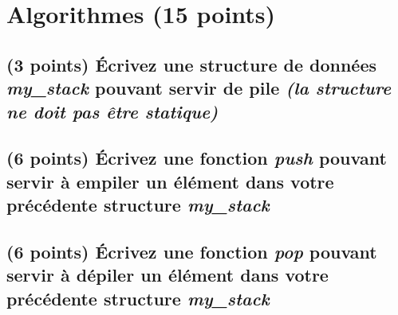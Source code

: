 \documentclass[11pt,a4paper]{article}
\begin{document}
%
\section{Algorithmes (15 points)}

\subsection{(3 points) \'Ecrivez une structure de données \og \textit{my\_stack} \fg{} pouvant servir de pile \textit{(la structure ne doit pas être statique)} }

\bigskip

\begin{center}
\end{center}

\bigskip


\newpage

\subsection{(6 points) \'Ecrivez une fonction \og \textit{push} \fg{} pouvant servir à empiler un élément dans votre précédente structure \og \textit{my\_stack} \fg{} }

\bigskip

\begin{center}

\end{center}

\bigskip


\newpage

\subsection{(6 points) \'Ecrivez une fonction \og \textit{pop} \fg{} pouvant servir à dépiler un élément dans votre précédente structure \og \textit{my\_stack} \fg{} }

\bigskip

\begin{center}
\end{center}

\bigskip
\end{document}
